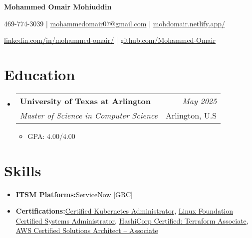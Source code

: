 \documentclass[a4paper,10pt]{article}
\makeatletter
\newcommand{\resumeItem}[2]{
  \item{
    \textbf{#1}{\hspace{0.5mm}#2 \vspace{-0.5mm}}
  }
}
\newcommand{\resumeSubheading}[4]{
\vspace{0.5mm}\item
    \begin{tabular*}{0.98\textwidth}[t]{l@{\extracolsep{\fill}}r}
        \textbf{#1} & \textit{\footnotesize{#4}} \\
        \textit{\footnotesize{#3}} &  \footnotesize{#2}\\
    \end{tabular*}
    \vspace{-2.4mm}
}
\newcommand{\resumeSubItem}[2]{\resumeItem{#1}{#2}\vspace{-4pt}}
\newcommand{\resumeSubHeadingListStart}{\begin{itemize}[leftmargin=*,labelsep=1mm]}
\newcommand{\resumeHeadingSkillStart}{\begin{itemize}[leftmargin=*,itemsep=1.7mm, rightmargin=2ex]}
\newcommand{\resumeItemListStart}{\begin{itemize}[leftmargin=*,labelsep=1mm,itemsep=0.5mm]}
\newcommand{\resumeSubHeadingListEnd}{\end{itemize}\vspace{2mm}}
\newcommand{\resumeHeadingSkillEnd}{\end{itemize}\vspace{-2mm}}
\newcommand{\resumeItemListEnd}{\end{itemize}\vspace{-2mm}}
\newcommand{\socialicon}[1]{\raisebox{-0.05em}{\resizebox{!}{1em}{#1}}}
\newcommand{\headerfontiii}{\fontfamily{ppl}\selectfont} %
\makeatother
\begin{document}
\headerfontiii

\begin{center}
    {\Huge\textbf{Mohammed Omair Mohiuddin}}
\end{center}
\vspace{-6mm}

\begin{center}
    \small{
    469-774-3039 | \href{mailto:mohammedomair07@gmail.com}{mohammedomair07@gmail.com} | 
    \href{https://mohdomair.netlify.app/}{mohdomair.netlify.app/}
    }
\end{center}
\vspace{-6mm}

\begin{center}
    \small{
    \socialicon{\faLinkedin} \href{https://www.linkedin.com/in/mohammed-omair/}{linkedin.com/in/mohammed-omair/} | 
    \socialicon{\faGithub} \href{https://github.com/Mohammed-Omair}{github.com/Mohammed-Omair}
    }
\end{center}

\vspace{-4mm}

\section{\textbf{Education}}
\vspace{-0.4mm}
\resumeSubHeadingListStart

\resumeSubheading
{University of Texas at Arlington}{Arlington, U.S}
{Master of Science in Computer Science}{May 2025}
\resumeItemListStart
\item GPA: 4.00/4.00
\resumeItemListEnd

\resumeSubHeadingListEnd
\vspace{-6mm}

\section{\textbf{Skills}}
\vspace{-0.4mm}
 \resumeHeadingSkillStart
  \resumeSubItem{ITSM Platforms:}
    {ServiceNow [GRC]}
  \resumeSubItem{Certifications:}
    {\href{https://www.credly.com/badges/4f2aa431-8ed9-4b9d-b438-3035ef2f9587/public_url}{Certified Kubernetes Administrator}, \href{https://www.credly.com/badges/d963c559-4088-49eb-8046-a8d314ef4a8a/public_url}{Linux Foundation Certified Systems Administrator}, \href{https://www.credly.com/badges/42af9d96-f66b-48ad-a771-5448d22b3b47/public_url}{HashiCorp Certified: Terraform Associate}, \href{https://www.credly.com/badges/c8ed5fc8-7ae0-4e7e-8b24-c97279288ab5/public_url}{AWS Certified Solutions Architect – Associate}}
 \resumeHeadingSkillEnd
\end{document}
